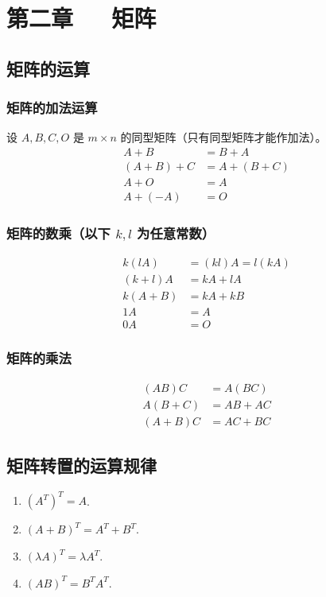 \documentclass[UTF8]{ctexart}
\theoremstyle{remark}
\begin{document}
	\section{第二章~~~矩阵}
	\subsection{矩阵的运算}
	\subsubsection{矩阵的加法运算}
	设 \(A, B, C, O\) 是 \(m\times n\) 的同型矩阵（只有同型矩阵才能作加法）。
	\begin{align*}
		A + B &= B + A\\
		(A + B) + C &= A + (B + C)\\
		A + O &= A\\
		A + (-A) &= O
	\end{align*}
	
	\subsubsection{矩阵的数乘（以下 \(k, l\) 为任意常数）}
	\begin{align*}
		k(lA) &= (kl)A = l(kA)\\
		(k + l)A &= kA + lA\\
		k(A + B) &= kA + kB\\
		1A &= A\\
		0A &= O
	\end{align*}
	
	\subsubsection{矩阵的乘法}
	\begin{align*}
		(AB)C &= A(BC)\\
		A(B + C) &= AB + AC\\
		(A + B)C &= AC + BC
	\end{align*}
	
	\subsection{矩阵转置的运算规律}
	\begin{enumerate}
		\item \((A^T)^T = A\).
		\item \((A + B)^T = A^T + B^T\).
		\item \((\lambda A)^T = \lambda A^T\).
		\item \((AB)^T = B^T A^T\).
	\end{enumerate}
	
\end{document}
